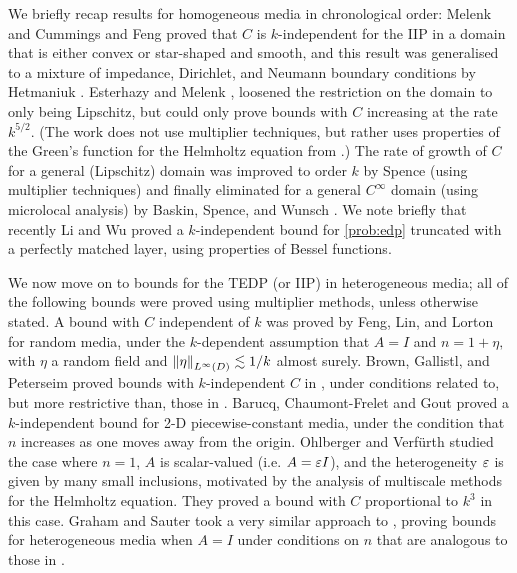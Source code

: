 We briefly recap results for homogeneous media in chronological order: Melenk \cite{Me:95} and Cummings and Feng \cite{CuFe:06} proved that $C$ is $k$-independent for the IIP in a domain that is either convex or star-shaped and smooth, and this result was generalised to a mixture of impedance, Dirichlet, and Neumann boundary conditions by Hetmaniuk \cite{He:07}. Esterhazy and Melenk \cite{EsMe:12}, loosened the restriction on the domain to only being Lipschitz, but could only prove bounds with $C$ increasing at the rate $k^{5/2}.$ (The work \cite{EsMe:12} does not use multiplier techniques, but rather uses properties of the Green's function for the Helmholtz equation from \cite{MeSa:10}.) The rate of growth of $C$ for a general (Lipschitz) domain was improved to order $k$ by Spence \cite{Sp:14} (using multiplier techniques) and finally eliminated for a general $C^\infty$ domain (using microlocal analysis) by Baskin, Spence, and Wunsch \cite{BaSpWu:16}. We note briefly that recently Li and Wu \cite{LiWu:18} proved a $k$-independent bound for \cref{prob:edp} truncated with a perfectly matched layer, using properties of Bessel functions.

We now move on to bounds for the TEDP (or IIP) in heterogeneous media; all of the following bounds were proved using multiplier methods, unless otherwise stated. A bound with $C$ independent of $k$ was proved by Feng, Lin, and Lorton \cite{FeLiLo:15} for random media, under the $k$-dependent assumption that $A=I$ and $n = 1 + \eta,$ with $\eta$ a random field and $\NLiD{\eta} \lesssim 1/k$ almost surely. Brown, Gallistl, and Peterseim proved bounds with $k$-independent $C$ in \cite{BrGaPe:17}, under conditions related to, but more restrictive than, those in \cite{GrPeSp:19}. Barucq, Chaumont-Frelet and Gout \cite{BaChGo:17} proved a $k$-independent bound for 2-D piecewise-constant media, under the condition that $n$ increases as one moves away from the origin. Ohlberger and Verf\"urth \cite{OhVe:18} studied the case where $n=1$, $A$ is scalar-valued (i.e. $A = \varepsilon I$), and the heterogeneity $\varepsilon$ is given by many small inclusions, motivated by the analysis of multiscale methods for the Helmholtz equation. They proved a bound with $C$ proportional to $k^3$ in this case. Graham and Sauter \cite{GrSa:18} took a very similar approach to \cite{GrPeSp:19}, proving bounds for heterogeneous media when $A=I$ under conditions on $n$ that are analogous to those in \cite{GrPeSp:19}.

